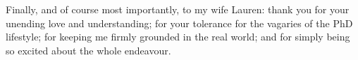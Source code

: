 Finally, and of course most importantly, to my wife Lauren: thank you
for your unending love and understanding; for your tolerance for the vagaries of
the PhD lifestyle; for keeping me firmly grounded in the real
world; and for simply being so excited about the whole endeavour.




\singlespace
\cleardoublepage
\tableofcontents
\listoftables
\listoffigures
\listofalgorithms

\cleardoublepage
\onehalfspace
{}











\singlespace

\appendix






